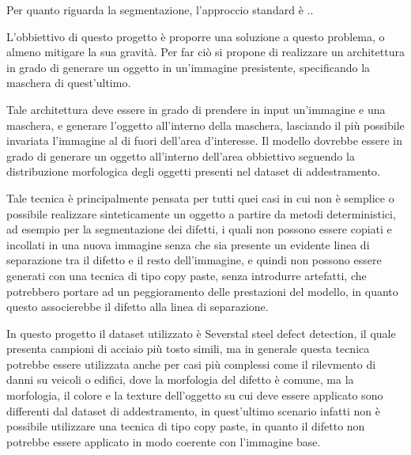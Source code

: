 Per quanto riguarda la segmentazione, l'approccio standard è ..

L'obbiettivo di questo progetto è proporre una soluzione a questo problema, o almeno mitigare la sua gravità.
Per far ciò si propone di realizzare un architettura in grado di generare un oggetto in un'immagine presistente, specificando la maschera di quest'ultimo.

Tale architettura deve essere in grado di prendere in input un'immagine e una maschera, e generare l'oggetto all'interno della maschera, 
lasciando il più possibile invariata l'immagine al di fuori dell'area d'interesse.
Il modello dovrebbe essere in grado di generare un oggetto all'interno dell'area obbiettivo seguendo la distribuzione morfologica degli oggetti 
presenti nel dataset di addestramento.

Tale tecnica è principalmente pensata per tutti quei casi in cui non è semplice o possibile realizzare sinteticamente un oggetto a partire da metodi deterministici, 
ad esempio per la segmentazione dei difetti, i quali non possono essere copiati e incollati in una nuova immagine senza che sia presente un evidente linea di separazione
tra il difetto e il resto dell'immagine, e quindi non possono essere generati con una tecnica di tipo copy paste, senza introdurre artefatti, che potrebbero 
portare ad un peggioramento delle prestazioni del modello, in quanto questo associerebbe il difetto alla linea di separazione.

In questo progetto il dataset utilizzato è Severstal steel defect detection, il quale presenta campioni di acciaio più tosto simili,
ma in generale questa tecnica potrebbe essere utilizzata anche per casi più complessi come il rilevmento di danni su veicoli o edifici,
dove la morfologia del difetto è comune, ma la morfologia, il colore e la texture dell'oggetto su cui deve essere applicato sono differenti 
dal dataset di addestramento, in quest'ultimo scenario infatti non è possibile utilizzare una tecnica di tipo copy paste, in quanto il difetto 
non potrebbe essere applicato in modo coerente con l'immagine base.